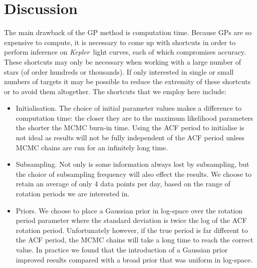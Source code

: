 \documentclass[useAMS, usenatbib, preprint, 12pt]{aastex}
\newcommand{\Kepler}{{\it Kepler}}
\newcommand{\kepler}{\Kepler}
\begin{document}
\section{Discussion}
\label{sec:discussion}

The main drawback of the GP method is computation time.
Because GPs are so expensive to compute, it is necessary to come up with
shortcuts in order to perform inference on \kepler\ light curves, each of
which compromises accuracy.
These shortcuts may only be necessary when working with a large number of
stars (of order hundreds or thousands).
If only interested in single or small numbers of targets it may be possible to
reduce the extremity of these shortcuts or to avoid them altogether.
The shortcuts that we employ here include:
\begin{itemize}
\item{Initialisation.
The choice of initial parameter values makes a difference to computation time:
the closer they are to the maximum likelihood parameters the shorter the MCMC
burn-in time.
Using the ACF period to initialise is not ideal as results will not be fully
independent of the ACF period unless MCMC chains are run for an infinitely
long time.}
\item{Subsampling.
Not only is some information always lost by subsampling, but the choice of
subsampling frequency will also effect the results.
We choose to retain an average of only 4 data points per day, based on the
range of rotation periods we are interested in.}
\item{Priors.
We choose to place a Gaussian prior in log-space over the rotation period
parameter where the standard deviation is twice the log of the ACF rotation
period.
Unfortunately however, if the true period is far different to the ACF period,
the MCMC chains will take a long time to reach the correct value.
In practice we found that the introduction of a Gaussian prior improved
results compared with a broad prior that was uniform in log-space.}
\end{itemize}
\end{document}

